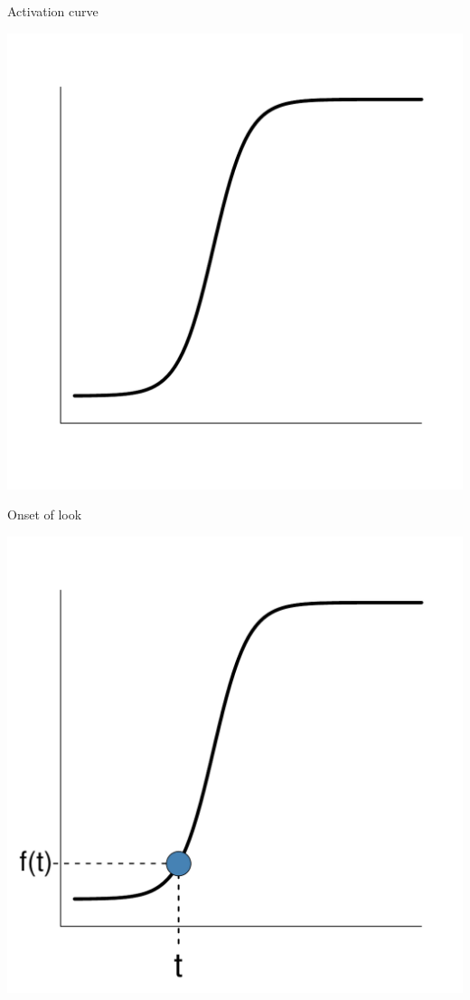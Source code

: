 \documentclass{beamer}
\begin{document}
\begin{frame}{Activation curve}
\vspace{-5mm}
\begin{center}
\includegraphics[scale=0.4]{img/logistic_a.pdf}
\end{center}


\end{frame}

\begin{frame}{Onset of look}
\vspace{-5mm}
\begin{center}
\includegraphics[scale=0.4]{img/logistic_b.pdf}
\end{center}

\end{frame}
\end{document}
